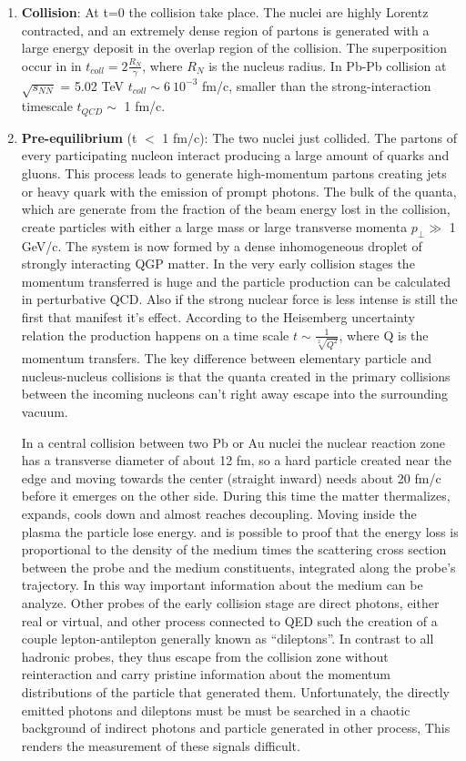 \documentclass[12pt,a4paper]{book}
\begin{document}
	\begin{enumerate}
		\item \textbf{Collision}: At t=0 the collision take place. The nuclei are highly Lorentz contracted, and an extremely dense region of partons is generated with a large energy deposit in the overlap region of the collision. The superposition occur in in $t_{coll} = 2 \frac{R_N}{\gamma}$, where $R_N$ is the nucleus radius. In Pb-Pb collision at $\sqrt{s_{NN}}$ = 5.02 TeV $t_{coll} \sim 6 \ 10^{-3}$ fm/c, smaller than the strong-interaction timescale $t_{QCD}\sim$ 1 fm/c. 
		\item \textbf{Pre-equilibrium} (t $<$ 1 fm/c): The two nuclei just collided. The partons of every participating nucleon interact producing a large amount of quarks and gluons. This process leads to generate high-momentum partons creating jets or heavy quark with the emission of prompt photons. The bulk of the quanta, which are generate from the fraction of the beam energy lost in the collision, create particles with either a large mass or large transverse momenta $p_\perp \gg$ 1 GeV/c. The system is now formed by a dense inhomogeneous droplet of strongly interacting QGP matter. In the very early collision stages the momentum transferred is huge and the particle production can be calculated in perturbative QCD. Also if the strong nuclear force is less intense is still the first that manifest it's effect. According to the Heisemberg uncertainty relation the production happens on a time scale $t \sim \frac{1}{\sqrt[2]{Q^2}}$, where Q is the momentum transfers. The key difference between elementary particle and nucleus-nucleus collisions is that the quanta created in the primary collisions between the incoming nucleons can’t right away escape into the surrounding vacuum. 
		
		In a central collision between two Pb or Au nuclei the nuclear reaction zone has a transverse diameter of about 12 fm, so a hard particle created near the edge and moving towards the center (straight inward) needs about 20 fm/c before it emerges on the other side. During this time the matter thermalizes, expands, cools down and almost reaches decoupling. Moving inside the plasma the particle lose energy. and is possible to proof that the energy loss is proportional to the density of the medium times the scattering cross section between the probe and the medium constituents, integrated along the probe’s trajectory. In this way important information about the medium can be analyze. Other probes of the early collision stage are direct photons, either real or virtual, and other process connected to QED such the creation of a couple lepton-antilepton generally known as “dileptons”.  In contrast to all hadronic probes, they thus escape from the collision zone without reinteraction and carry pristine information about the momentum distributions of the particle that generated them. Unfortunately, the directly emitted photons and dileptons must be must be searched in a chaotic background of indirect photons and particle generated in other process, This renders the measurement of these signals difficult. 
		

\end{enumerate}
\end{document}
